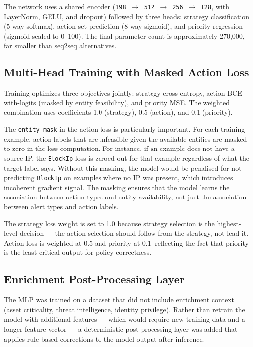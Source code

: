 The network uses a shared encoder (\texttt{198 $\rightarrow$ 512 $\rightarrow$ 256 $\rightarrow$ 128}, with LayerNorm, GELU, and dropout) followed by three heads: strategy classification (5-way softmax), action-set prediction (8-way sigmoid), and priority regression (sigmoid scaled to 0--100). The final parameter count is approximately 270,000, far smaller than seq2seq alternatives.

\subsection{Multi-Head Training with Masked Action Loss}

Training optimizes three objectives jointly: strategy cross-entropy, action BCE-with-logits (masked by entity feasibility), and priority MSE. The weighted combination uses coefficients 1.0 (strategy), 0.5 (action), and 0.1 (priority).

The \texttt{entity\_mask} in the action loss is particularly important. For each training example, action labels that are infeasible given the available entities are masked to zero in the loss computation. For instance, if an example does not have a source IP, the \texttt{BlockIp} loss is zeroed out for that example regardless of what the target label says. Without this masking, the model would be penalised for not predicting \texttt{BlockIp} on examples where no IP was present, which introduces incoherent gradient signal. The masking ensures that the model learns the association between action types and entity availability, not just the association between alert types and action labels.

The strategy loss weight is set to 1.0 because strategy selection is the highest-level decision --- the action selection should follow from the strategy, not lead it. Action loss is weighted at 0.5 and priority at 0.1, reflecting the fact that priority is the least critical output for policy correctness.

\subsection{Enrichment Post-Processing Layer}

The MLP was trained on a dataset that did not include enrichment context (asset criticality, threat intelligence, identity privilege). Rather than retrain the model with additional features --- which would require new training data and a longer feature vector --- a deterministic post-processing layer was added that applies rule-based corrections to the model output after inference.


